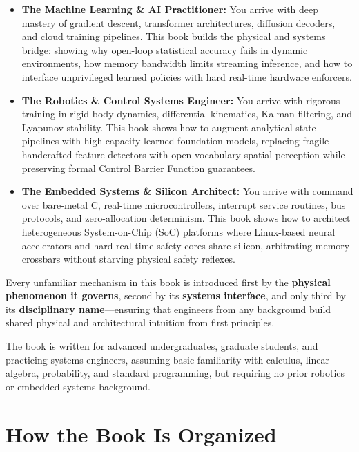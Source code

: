 \documentclass[
  9pt,
  letterpaper,
  open=right,
  numbers=noenddot,
  captions=tableheading]{scrbook}
\makeatletter
\providecommand{\tightlist}{%
  \setlength{\itemsep}{0pt}\setlength{\parskip}{0pt}}
\def\tightlist{}
\let\tightlist\relax
\newif\ifmlsys@inside@longtable
\newif\ifmlsys@longtable@numbered
\let\mlsys@orig@label\label
\renewcommand{\label}[1]{%
  \ifmlsys@inside@longtable
    \global\mlsys@longtable@numberedtrue
  \fi
  \mlsys@orig@label{#1}%
}
\let\label\mlsys@orig@label
\makeatother
\begin{document}
\begin{itemize}
\tightlist
\item
  \textbf{The Machine Learning \& AI Practitioner:} You arrive with deep
  mastery of gradient descent, transformer architectures, diffusion
  decoders, and cloud training pipelines. This book builds the physical
  and systems bridge: showing why open-loop statistical accuracy fails
  in dynamic environments, how memory bandwidth limits streaming
  inference, and how to interface unprivileged learned policies with
  hard real-time hardware enforcers.
\item
  \textbf{The Robotics \& Control Systems Engineer:} You arrive with
  rigorous training in rigid-body dynamics, differential kinematics,
  Kalman filtering, and Lyapunov stability. This book shows how to
  augment analytical state pipelines with high-capacity learned
  foundation models, replacing fragile handcrafted feature detectors
  with open-vocabulary spatial perception while preserving formal
  Control Barrier Function guarantees.
\item
  \textbf{The Embedded Systems \& Silicon Architect:} You arrive with
  command over bare-metal C, real-time microcontrollers, interrupt
  service routines, bus protocols, and zero-allocation determinism. This
  book shows how to architect heterogeneous System-on-Chip (SoC)
  platforms where Linux-based neural accelerators and hard real-time
  safety cores share silicon, arbitrating memory crossbars without
  starving physical safety reflexes.
\end{itemize}

Every unfamiliar mechanism in this book is introduced first by the
\textbf{physical phenomenon it governs}, second by its \textbf{systems
interface}, and only third by its \textbf{disciplinary name}---ensuring
that engineers from any background build shared physical and
architectural intuition from first principles.

The book is written for advanced undergraduates, graduate students, and
practicing systems engineers, assuming basic familiarity with calculus,
linear algebra, probability, and standard programming, but requiring no
prior robotics or embedded systems background.

\section*{How the Book Is Organized}\label{how-the-book-is-organized}
\end{document}
